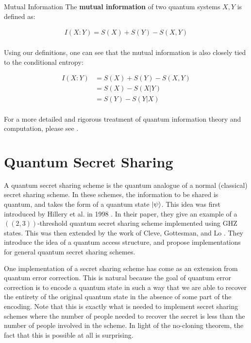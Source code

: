 \begin{definition}{Mutual Information}
    The \textbf{mutual information} of two quantum systems $X,Y$ is defined as:
    
    \begin{align*}
        I(X:Y) = S(X) + S(Y) - S(X,Y) \\ 
    \end{align*}
\end{definition}

Using our definitions, one can see that the mutual information is also closely tied to the conditional entropy:

\begin{align*}
        I(X:Y) &= S(X) + S(Y) - S(X,Y) \\ 
        &= S(X) - S(X|Y) \\ 
        &= S(Y) - S(Y|X) \\ 
\end{align*}
    
For a more detailed and rigorous treatment of quantum information theory and computation, please see \cite{}.    

\section{Quantum Secret Sharing}
\label{section:qss}

A quantum secret sharing scheme is the quantum analogue of a normal (classical) secret sharing scheme. In these schemes, the information to be shared is quantum, and takes the form of a quantum state $\ket{\psi}$. This idea was first introduced by Hillery et al. in 1998 \cite{Hillery_1999}. In their paper, they give an example of a $((2,3))$-threshold quantum secret sharing scheme implemented using GHZ states. This was then extended by the work of Cleve, Gottesman, and Lo \cite{Cleve_1999}. They introduce the idea of a quantum access structure, and propose implementations for general quantum secret sharing schemes.

One implementation of a secret sharing scheme has come as an extension from quantum error correction. This is natural because the goal of quantum error correction is to encode a quantum state in such a way that we are able to recover the entirety of the original quantum state in the absence of some part of the encoding. Note that this is exactly what is needed to implement secret sharing schemes where the number of people needed to recover the secret is less than the number of people involved in the scheme. In light of the no-cloning theorem, the fact that this is possible at all is surprising. 

